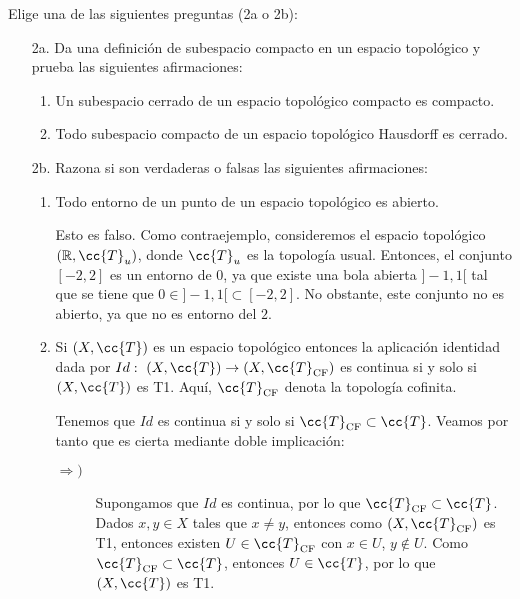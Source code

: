\documentclass[12pt]{article}
\newcommand{\T}[0]{\cc{T}}
\begin{document}
    \begin{ejercicio}[2.5 puntos]
        Elige una de las siguientes preguntas (2a o 2b):
        \begin{enumerate}
          \item[2a.] Da una definición de subespacio compacto en un espacio topológico y prueba las siguientes afirmaciones:
          \begin{enumerate}
            \item Un subespacio cerrado de un espacio topológico compacto es compacto.
            \item Todo subespacio compacto de un espacio topológico Hausdorff es cerrado.
          \end{enumerate}

          \item[2b.] Razona si son verdaderas o falsas las siguientes afirmaciones:
          \begin{enumerate}
            \item Todo entorno de un punto de un espacio topológico es abierto.
            
            Esto es falso. Como contraejemplo, consideremos el espacio topológico $(\mathbb{R}, \T_u)$, donde $\T_u$ es la topología usual.
            Entonces, el conjunto $[-2,2]$ es un entorno de $0$, ya que existe una bola abierta $]-1,1[$ tal que se tiene que $0 \in ]-1,1[ \subset [-2,2]$.
            No obstante, este conjunto no es abierto, ya que no es entorno del $2$.

            \item Si $(X, \T)$ es un espacio topológico entonces la aplicación identidad dada por $Id:~(X, \T) \to (X, \T_{\text{CF}})$ es continua si y solo si $(X,\T)$ es T1. Aquí, $\T_{\text{CF}}$ denota la topología cofinita.
            
            Tenemos que $Id$ es continua si y solo si $\T_{\text{CF}} \subset \T$. Veamos por tanto que es cierta
            mediante doble implicación:
            \begin{description}
              \item[$\Longrightarrow)$] Supongamos que $Id$ es continua, por lo que $\T_{\text{CF}} \subset \T$.
              Dados $x,y\in X$ tales que $x \neq y$, entonces como $(X,\T_{\text{CF}})$ es T1, entonces
              existen $U\in \T_{\text{CF}}$ con $x\in U$, $y\notin U$. Como $\T_{\text{CF}} \subset \T$,
              entonces $U\in \T$, por lo que $(X,\T)$ es T1.


\end{description}
\end{enumerate}
\end{enumerate}
\end{ejercicio}
\end{document}
